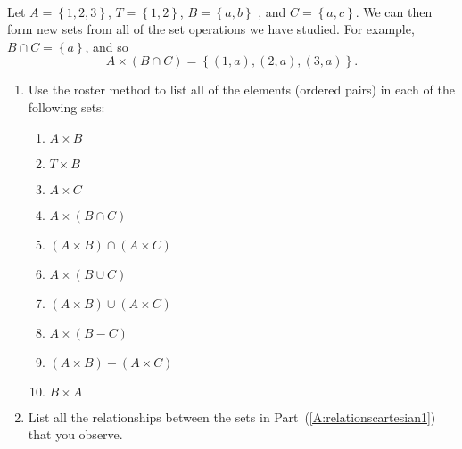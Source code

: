 \begin{prog} \hfill \label{prog:relationscartesian} \\
Let  $A = \left\{ {1,2,3} \right\}$, $T = \left\{ {1,2} \right\}$, $B = \left\{ {a,b} \right\}$
, and  $C = \left\{ {a,c} \right\}$.  We can then form new sets from all of the set operations we have studied.  For example,  $B \cap C = \left\{ a \right\}$, and so
\[
A \times \left( {B \cap C} \right) = \left\{ {\left( {1,a} \right),\left( {2,a} \right),\left( {3,a} \right)} \right\}.
\]

\begin{enumerate}
\item Use the roster method to list all of the elements (ordered pairs) in each of the following sets:
\label{A:relationscartesian1}%

\begin{multicols}{2}
\begin{enumerate}
  \item $A \times B$
  \item $T \times B$
  \item $A \times C$
  \item $A \times \left( {B \cap C} \right)$
  \item $\left( {A \times B} \right) \cap \left( {A \times C} \right)$
  \item $A \times \left( {B \cup C} \right)$
  \item $\left( {A \times B} \right) \cup \left( {A \times C} \right)$
  \item $A \times \left( {B - C} \right)$
  \item $\left( {A \times B} \right) - \left( {A \times C} \right)$
  \item $B \times A$
\end{enumerate}
\end{multicols}

\item List all the relationships between the sets in Part~(\ref{A:relationscartesian1}) that you observe.
\end{enumerate}
\end{prog}
\hbreak
